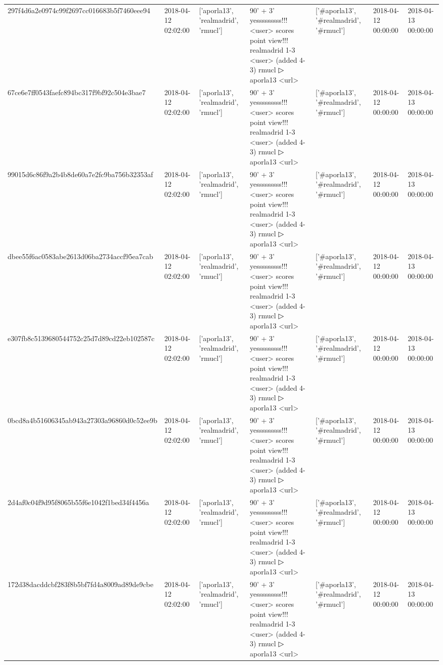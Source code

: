 \begin{tabular}{lllllll}
297f4d6a2e0974c99f2697cc016683b5f7460eee94 & 2018-04-12 02:02:00 & ['aporla13', 'realmadrid', 'rmucl'] & 90' + 3' yesssssssss!!! <user> scores point view!!! realmadrid 1-3 <user> (added 4-3) rmucl ▷ aporla13 <url> & ['#aporla13', '#realmadrid', '#rmucl'] & 2018-04-12 00:00:00 & 2018-04-13 00:00:00 \\
67ce6e7ff0543faefc894bc317f9bf92c504e3bae7 & 2018-04-12 02:02:00 & ['aporla13', 'realmadrid', 'rmucl'] & 90' + 3' yesssssssss!!! <user> scores point view!!! realmadrid 1-3 <user> (added 4-3) rmucl ▷ aporla13 <url> & ['#aporla13', '#realmadrid', '#rmucl'] & 2018-04-12 00:00:00 & 2018-04-13 00:00:00 \\
99015d6c86f9a2b4b8de60a7e2fc9ba756b32353af & 2018-04-12 02:02:00 & ['aporla13', 'realmadrid', 'rmucl'] & 90' + 3' yesssssssss!!! <user> scores point view!!! realmadrid 1-3 <user> (added 4-3) rmucl ▷ aporla13 <url> & ['#aporla13', '#realmadrid', '#rmucl'] & 2018-04-12 00:00:00 & 2018-04-13 00:00:00 \\
dbee55f6ac0583abe2613d06ba2734accf95ea7cab & 2018-04-12 02:02:00 & ['aporla13', 'realmadrid', 'rmucl'] & 90' + 3' yesssssssss!!! <user> scores point view!!! realmadrid 1-3 <user> (added 4-3) rmucl ▷ aporla13 <url> & ['#aporla13', '#realmadrid', '#rmucl'] & 2018-04-12 00:00:00 & 2018-04-13 00:00:00 \\
e307fb8c5139680544752c25d7d89cd22eb102587c & 2018-04-12 02:02:00 & ['aporla13', 'realmadrid', 'rmucl'] & 90' + 3' yesssssssss!!! <user> scores point view!!! realmadrid 1-3 <user> (added 4-3) rmucl ▷ aporla13 <url> & ['#aporla13', '#realmadrid', '#rmucl'] & 2018-04-12 00:00:00 & 2018-04-13 00:00:00 \\
0bcd8a4b51606345ab943a27303a96860d0c52ee9b & 2018-04-12 02:02:00 & ['aporla13', 'realmadrid', 'rmucl'] & 90' + 3' yesssssssss!!! <user> scores point view!!! realmadrid 1-3 <user> (added 4-3) rmucl ▷ aporla13 <url> & ['#aporla13', '#realmadrid', '#rmucl'] & 2018-04-12 00:00:00 & 2018-04-13 00:00:00 \\
2d4af0c04f9d95f8065b55f6e1042f1bed34f4456a & 2018-04-12 02:02:00 & ['aporla13', 'realmadrid', 'rmucl'] & 90' + 3' yesssssssss!!! <user> scores point view!!! realmadrid 1-3 <user> (added 4-3) rmucl ▷ aporla13 <url> & ['#aporla13', '#realmadrid', '#rmucl'] & 2018-04-12 00:00:00 & 2018-04-13 00:00:00 \\
172d38dacddcbf283f8b5bf7fd4a8009ad89de9cbe & 2018-04-12 02:02:00 & ['aporla13', 'realmadrid', 'rmucl'] & 90' + 3' yesssssssss!!! <user> scores point view!!! realmadrid 1-3 <user> (added 4-3) rmucl ▷ aporla13 <url> & ['#aporla13', '#realmadrid', '#rmucl'] & 2018-04-12 00:00:00 & 2018-04-13 00:00:00 \\

\end{tabular}

